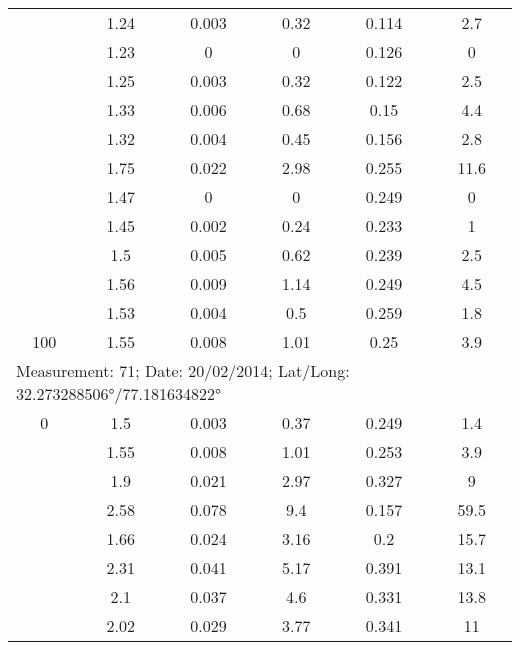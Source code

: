 \begin{longtable}{cccccc}
		& 1.24  & 0.003 & 0.32  & 0.114 & 2.7 \\
		
		& 1.23  & 0     & 0     & 0.126 & 0 \\
		
		& 1.25  & 0.003 & 0.32  & 0.122 & 2.5 \\
		
		& 1.33  & 0.006 & 0.68  & 0.15  & 4.4 \\
		
		& 1.32  & 0.004 & 0.45  & 0.156 & 2.8 \\
		
		& 1.75  & 0.022 & 2.98  & 0.255 & 11.6 \\
		
		& 1.47  & 0     & 0     & 0.249 & 0 \\
		
		& 1.45  & 0.002 & 0.24  & 0.233 & 1 \\
		
		& 1.5   & 0.005 & 0.62  & 0.239 & 2.5 \\
		
		& 1.56  & 0.009 & 1.14  & 0.249 & 4.5 \\
		
		& 1.53  & 0.004 & 0.5   & 0.259 & 1.8 \\
		
		100   & 1.55  & 0.008 & 1.01  & 0.25  & 3.9 \\
		\midrule
		\multicolumn{6}{l}{Measurement: 71; Date: 20/02/2014;
			Lat/Long: 32.273288506°/77.181634822°} \\		
		\midrule
		0     & 1.5   & 0.003 & 0.37  & 0.249 & 1.4 \\
		
		& 1.55  & 0.008 & 1.01  & 0.253 & 3.9 \\
		
		& 1.9   & 0.021 & 2.97  & 0.327 & 9 \\
		
		& 2.58  & 0.078 & 9.4   & 0.157 & 59.5 \\
		
		& 1.66  & 0.024 & 3.16  & 0.2   & 15.7 \\
		
		& 2.31  & 0.041 & 5.17  & 0.391 & 13.1 \\
		
		& 2.1   & 0.037 & 4.6   & 0.331 & 13.8 \\
		
		& 2.02  & 0.029 & 3.77  & 0.341 & 11 \\
		

\end{longtable}
